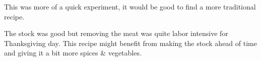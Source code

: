\begin{experiments}
\item This was more of a quick experiment, it would be good to find a more traditional recipe.
\item The stock was good but removing the meat was quite labor intensive for Thanksgiving day. This recipe
    might benefit from making the stock ahead of time and giving it a bit more spices \& vegetables.
\end{experiments}

\recipeend%
